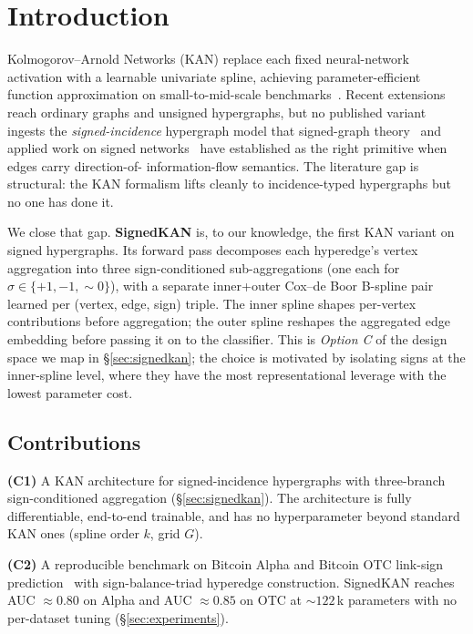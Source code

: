\section{Introduction}
\label{sec:introduction}

Kolmogorov--Arnold Networks (KAN) replace each fixed neural-network
activation with a learnable univariate spline, achieving
parameter-efficient function approximation on small-to-mid-scale
benchmarks~\cite{liu2024kan}. Recent extensions reach ordinary graphs
and unsigned hypergraphs, but no published variant ingests the
\emph{signed-incidence} hypergraph model that signed-graph
theory~\cite{cartwright1956structural} and applied work on signed
networks~\cite{leskovec2010signed,derr2018sgcn,huang2019sigat} have
established as the right primitive when edges carry direction-of-
information-flow semantics. The literature gap is structural: the KAN
formalism lifts cleanly to incidence-typed hypergraphs but no one has
done it.

We close that gap. \textbf{SignedKAN} is, to our knowledge, the first
KAN variant on signed hypergraphs. Its forward pass decomposes each
hyperedge's vertex aggregation into three sign-conditioned
sub-aggregations (one each for $\sigma \in \{+1, -1, \sim 0\}$), with
a separate inner+outer Cox--de Boor B-spline pair learned per
(vertex, edge, sign) triple. The inner spline shapes per-vertex
contributions before aggregation; the outer spline reshapes the
aggregated edge embedding before passing it on to the classifier.
This is \emph{Option C} of the design space we map in
\S\ref{sec:signedkan}; the choice is motivated by isolating signs at
the inner-spline level, where they have the most representational
leverage with the lowest parameter cost.

\subsection*{Contributions}

\textbf{(C1)} A KAN architecture for signed-incidence hypergraphs
with three-branch sign-conditioned aggregation
(\S\ref{sec:signedkan}). The architecture is fully differentiable,
end-to-end trainable, and has no hyperparameter beyond standard KAN
ones (spline order $k$, grid $G$).

\textbf{(C2)} A reproducible benchmark on Bitcoin Alpha and Bitcoin
OTC link-sign prediction~\cite{kumar2016bitcoin} with
sign-balance-triad hyperedge construction. SignedKAN reaches
AUC $\approx 0.80$ on Alpha and AUC $\approx 0.85$ on OTC at
$\sim 122$\,k parameters with no per-dataset tuning
(\S\ref{sec:experiments}).

